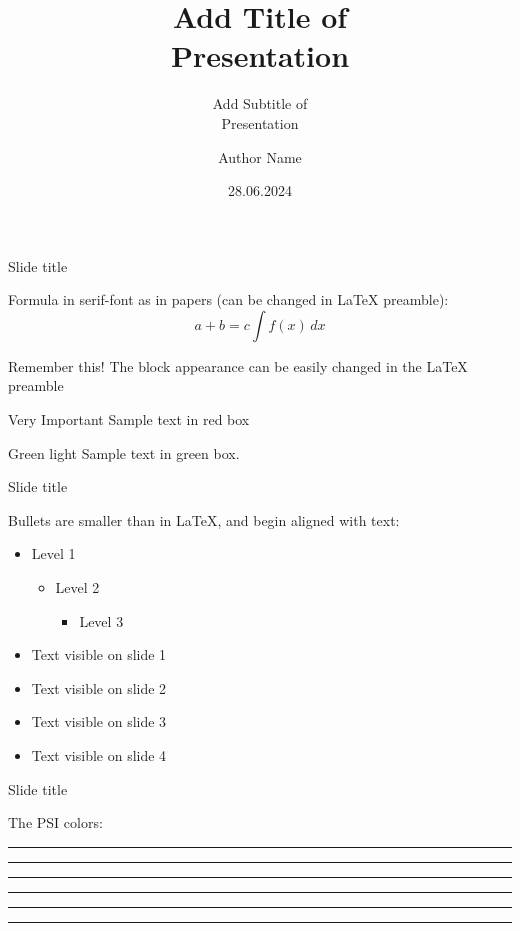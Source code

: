 \documentclass[aspectratio=169,t]{beamer}  %
\title[Short title]{Add Title of\\Presentation}
\subtitle{Add Subtitle of\\Presentation}
\author[Short author]{Author Name}
\date{28.06.2024}
\institute{Location}
\begin{document}
\begin{frame}[plain,c] %
 \titlepage
\end{frame}


\begin{frame}{Slide title}

Formula in serif-font as in papers (can be changed in LaTeX preamble):
\begin{equation}
    a + b = c \int f(x)\,dx
\end{equation}

\begin{block}{Remember this!}
The block appearance can be easily changed in the LaTeX preamble
\end{block}

\begin{alertblock}{Very Important}
Sample text in red box
\end{alertblock}

\begin{examples}{Green light}
Sample text in green box.
\end{examples}

\end{frame}


\begin{frame}{Slide title}

Bullets are smaller than in LaTeX, and begin aligned with text: 
\begin{itemize}
 \item Level 1
 \begin{itemize}
     \item Level 2
     \begin{itemize}
          \item Level 3
      \end{itemize}    
 \end{itemize}     
\end{itemize}

\begin{itemize}
 \item <1-> Text visible on slide 1
 \item <2-> Text visible on slide 2
 \item <3>  Text visible on slide 3
 \item <4-> Text visible on slide 4
\end{itemize}

\end{frame}


\begin{frame}{Slide title}

The PSI colors:
\medskip

\textcolor{PSIgreen}{\rule{1cm}{1cm}}
\textcolor{PSIyellow}{\rule{1cm}{1cm}}
\textcolor{PSIpink}{\rule{1cm}{1cm}}
\textcolor{PSIblue}{\rule{1cm}{1cm}}
\textcolor{PSIred}{\rule{1cm}{1cm}}
\textcolor{PSIviolet}{\rule{1cm}{1cm}}

\end{frame}
\end{document}

